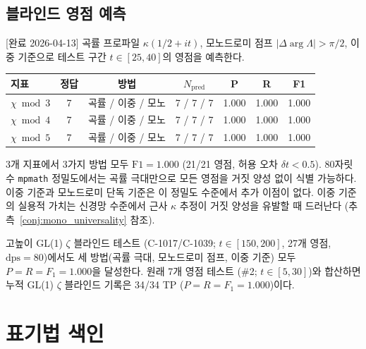 \documentclass[11pt, a4paper]{article}
\theoremstyle{definition}
\theoremstyle{plain}
\begin{document}
\subsection{블라인드 영점 예측}
\label{app:dirichlet:blind}

[완료 2026-04-13]
곡률 프로파일 $\kappa(1/2+it)$, 모노드로미 점프 $|\Delta\arg\Lambda|>\pi/2$, 이중 기준으로 테스트 구간 $t\in[25,40]$의 영점을 예측한다.

\begin{center}
\small
\begin{tabular}{lcccccc}
\toprule
\textbf{지표} & \textbf{정답} & \textbf{방법} & $N_{\mathrm{pred}}$ & \textbf{P} & \textbf{R} & \textbf{F1} \\
\midrule
$\chi\bmod 3$ & 7 & 곡률 / 이중 / 모노 & 7 / 7 / 7 & 1.000 & 1.000 & 1.000 \\
$\chi\bmod 4$ & 7 & 곡률 / 이중 / 모노 & 7 / 7 / 7 & 1.000 & 1.000 & 1.000 \\
$\chi\bmod 5$ & 7 & 곡률 / 이중 / 모노 & 7 / 7 / 7 & 1.000 & 1.000 & 1.000 \\
\bottomrule
\end{tabular}
\end{center}

\noindent
3개 지표에서 3가지 방법 모두 $\mathrm{F1}=1.000$ (21/21 영점, 허용 오차 $\delta t < 0.5$). 80자릿수 \texttt{mpmath} 정밀도에서는 곡률 극대만으로 모든 영점을 거짓 양성 없이 식별 가능하다. 이중 기준과 모노드로미 단독 기준은 이 정밀도 수준에서 추가 이점이 없다. 이중 기준의 실용적 가치는 신경망 수준에서 근사 $\kappa$ 추정이 거짓 양성을 유발할 때 드러난다 (추측~\ref{conj:mono_universality} 참조).

\noindent
고높이 GL(1) $\zeta$ 블라인드 테스트 (C-1017/C-1039; $t\in[150,200]$, 27개 영점,
$\mathrm{dps}{=}80$)에서도 세 방법(곡률 극대, 모노드로미 점프, 이중 기준) 모두
$P = R = F_1 = 1.000$을 달성한다.
원래 7개 영점 테스트 (\#2; $t\in[5,30]$)와 합산하면
누적 GL(1) $\zeta$ 블라인드 기록은 34/34 TP ($P = R = F_1 = 1.000$)이다.

\section{표기법 색인}
\label{app:notation}
\end{document}
